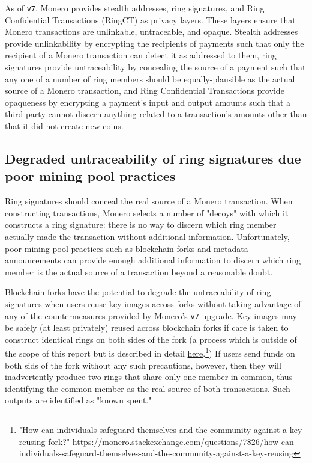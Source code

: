 \documentclass[notitlepage]{report}
\begin{document}
As of \verb/v7/, Monero provides stealth addresses, ring signatures, and Ring Confidential Transactions (RingCT) as privacy layers.  These layers ensure that Monero transactions are unlinkable, untraceable, and opaque.  Stealth addresses provide unlinkability by encrypting the recipients of payments such that only the recipient of a Monero transaction can detect it as addressed to them, ring signatures provide untraceability by concealing the source of a payment such that any one of a number of ring members should be equally-plausible as the actual source of a Monero transaction, and Ring Confidential Transactions provide opaqueness by encrypting a payment's input and output amounts such that a third party cannot discern anything related to a transaction's amounts other than that it did not create new coins.

\subsection{Degraded untraceability of ring signatures due poor mining pool practices}

Ring signatures should conceal the real source of a Monero transaction.  When constructing transactions, Monero selects a number of "decoys" with which it constructs a ring signature: there is no way to discern which ring member actually made the transaction without additional information.  Unfortunately, poor mining pool practices such as blockchain forks and metadata announcements can provide enough additional information to discern which ring member is the actual source of a transaction beyond a reasonable doubt.

Blockchain forks have the potential to degrade the untraceability of ring signatures when users reuse key images across forks without taking advantage of any of the countermeasures provided by Monero's \verb/v7/ upgrade.  Key images may be safely (at least privately) reused across blockchain forks if care is taken to construct identical rings on both sides of the fork (a process which is outside of the scope of this report but is described in detail \href{https://monero.stackexchange.com/questions/7826/how-can-individuals-safeguard-themselves-and-the-community-against-a-key-reusing}{here}.\footnote{"How can individuals safeguard themselves and the community against a key reusing fork?" https://monero.stackexchange.com/questions/7826/how-can-individuals-safeguard-themselves-and-the-community-against-a-key-reusing})  If users send funds on both sids of the fork without any such precautions, however, then they will inadvertently produce two rings that share only one member in common, thus identifying the common member as the real source of both transactions.  Such outputs are identified as "known spent."
\end{document}
